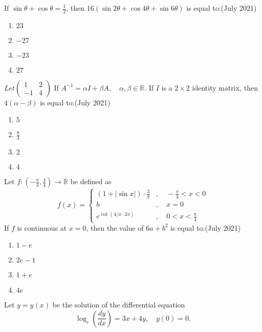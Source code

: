 \item If $\sin\theta+\cos\theta=\frac{1}{2}$, then $16(\sin2\theta+\cos4\theta+\sin6\theta)$ is equal to:\hfill{(July 2021)}
\begin{enumerate}
    \item $23$
    \item $-27$
    \item $-23$
    \item $27$
\end{enumerate}
  \item $Let \begin{pmatrix}
      1 & 2\\
      -1 & 4
  \end{pmatrix}$
      If $ A^{-1} = \alpha I + \beta A, \quad \alpha, \beta \in \mathbb{R} $. If $ I $ is a $ 2 \times 2 $ identity matrix, then $ 4(\alpha - \beta) $ is equal to:\hfill{(July 2021)}
    \begin{enumerate}
        \item $ 5 $
        \item $ \frac{8}{3} $
        \item $ 2 $
        \item $ 4 $
    \end{enumerate}
\item Let $ f: \left(-\frac{\pi}{4}, \frac{4}{4}\right) \to \mathbb{R} $ be defined as
\begin{equation*}
       f(x) =
    \begin{cases}
        (1 + |\sin x|) \cdot \frac{3}{\pi} & , \quad -\frac{\pi}{4} < x < 0 \\
        b & , \quad x = 0 \\
        e^{\cot(4/x \cdot 2x)} & , \quad 0 < x < \frac{\pi}{4}
    \end{cases}
  \end{equation*}
    If $ f $ is continuous at $ x = 0 $, then the value of $ 6a + b^2 $ is equal to:\hfill{(July 2021)}
    \begin{enumerate}
        \item $ 1 - e $
        \item $ 2e - 1 $
        \item $ 1 + e $
        \item $ 4e $
    \end{enumerate}
 \item Let $y = y(x)$ be the solution of the differential equation 
    \begin{equation*}
    \log_e\left(\frac{dy}{dx}\right) = 3x + 4y, \quad y(0) = 0.
    \end{equation*}
